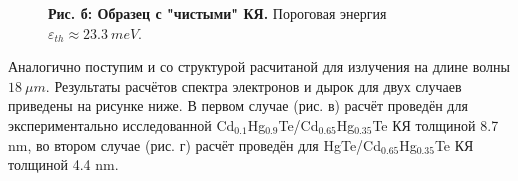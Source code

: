 \documentclass[../main.tex]{subfiles}
\begin{document}
\begin{figure}[h!]
\begin{minipage}[h]{0.49\linewidth}
\begin{center}
                    \textbf{Рис. б: Образец с "чистыми" КЯ.} Пороговая энергия 
                        $\varepsilon_{th} \approx 23.3~meV$.
                \end{center}
            \end{minipage}
        \end{figure}
        
        Аналогично поступим и со структурой расчитаной для излучения на длине волны  
        $18~\mu m$. Результаты расчётов спектра электронов и дырок для двух случаев приведены на рисунке ниже. В первом случае (рис. в) расчёт проведён 
        для экспериментально исследованной Cd${}_{0.1}$Hg${}_{0.9}$Te/Cd${}_{0.65}$Hg${}_{0.35}$Te КЯ толщиной 8.7 nm, во втором случае (рис. г) расчёт проведён для 
        HgTe/Cd${}_{0.65}$Hg${}_{0.35}$Te КЯ толщиной 4.4 nm.
        
\end{document}

